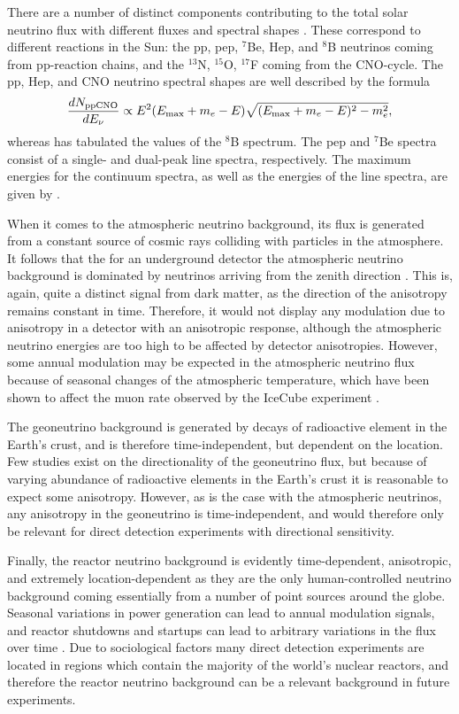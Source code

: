 There are a number of distinct components contributing to the total solar neutrino flux with different fluxes and spectral shapes \parencite{VitaglianoTamborraRaffelt2020}. These correspond to different reactions in the Sun: the pp, pep, $^7$Be, Hep, and $^8$B neutrinos coming from pp-reaction chains, and the $^{13}$N, $^{15}$O, $^{17}$F coming from the CNO-cycle. The pp, Hep, and CNO neutrino spectral shapes are well described by the formula
\begin{equation}
    \frac{dN_\text{ppCNO}}{dE_\nu}\propto E^2(E_\text{max}+m_e-E)\sqrt{(E_\text{max}+m_e-E)^2-m_e^2},
\end{equation}
whereas \textcite{BahcallEtAl1996} has tabulated the values of the $^8$B spectrum. The pep and $^7$Be spectra consist of a single- and dual-peak line spectra, respectively. The maximum energies for the continuum spectra, as well as the energies of the line spectra, are given by \textcite{Bahcall1997}.

When it comes to the atmospheric neutrino background, its flux is generated from a constant source of cosmic rays colliding with particles in the atmosphere. It follows that the for an underground detector the atmospheric neutrino background is dominated by neutrinos arriving from the zenith direction \parencite{GaisserHonda2002}. This is, again, quite a distinct signal from dark matter, as the direction of the anisotropy remains constant in time. Therefore, it would not display any modulation due to anisotropy in a detector with an anisotropic response, although the atmospheric neutrino energies are too high to be affected by detector anisotropies. However, some annual modulation may be expected in the atmospheric neutrino flux because of seasonal changes of the atmospheric temperature, which have been shown to affect the muon rate observed by the IceCube experiment \parencite{SerapEtAl2010}.

The geoneutrino background is generated by decays of radioactive element in the Earth's crust, and is therefore time-independent, but dependent on the location. Few studies exist on the directionality of the geoneutrino flux, but because of varying abundance of radioactive elements in the Earth's crust it is reasonable to expect some anisotropy. However, as is the case with the atmospheric neutrinos, any anisotropy in the geoneutrino is time-independent, and would therefore only be relevant for direct detection experiments with directional sensitivity.

Finally, the reactor neutrino background is evidently time-dependent, anisotropic, and extremely location-dependent as they are the only human-controlled neutrino background coming essentially from a number of point sources around the globe. Seasonal variations in power generation can lead to annual modulation signals, and reactor shutdowns and startups can lead to arbitrary variations in the flux over time \parencite{Baldoncini2015}. Due to sociological factors many direct detection experiments are located in regions which contain the majority of the world's nuclear reactors, and therefore the reactor neutrino background can be a relevant background in future experiments.

